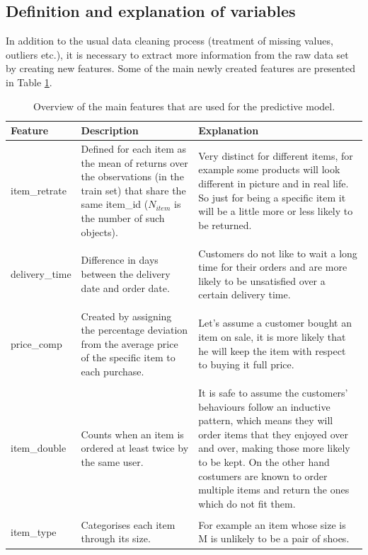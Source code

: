 \documentclass[a4paper,12pt]{article}
\begin{document}
 \subsection{Definition and explanation of variables }  \label{Subsec::variables}
In addition to the usual data cleaning process (treatment of missing values, outliers etc.), it is necessary to extract more information from the raw data set by creating new features. Some of the main newly created features are presented in Table \ref{Table::Features}.
\begin{table}[h]
\begin{tabular}{|l p{6.5cm} p{6.5cm}|}
\hline
\textbf{Feature} & \textbf{Description} & \textbf{Explanation} \\
\hline \hline
item\_retrate 
& Defined for each item as  the mean of returns over the observations (in the train set) that share the same item\_id ($N_{item}$ is the number of such objects).
& Very distinct for different items, for example some  products will look different       in picture and in real life. So just for being a specific item   it will be a little more or less likely  to be returned. \\
& & \\
delivery\_time 
& Difference in days between the delivery date and order date.
& Customers do not like to wait a  long time for their orders and  are more likely to be unsatisfied  over a certain delivery time.  \\
& & \\
price\_comp
& Created by assigning the percentage deviation from the average price of the specific item to each purchase. 
& Let's assume a customer bought an item on sale, it is more likely that he will keep the item with respect to buying it full price. \\
& & \\
item\_double
& Counts when an item is ordered  at least twice by the same user.
& It is safe to assume the customers' behaviours follow an inductive pattern, which means they will  order items that they enjoyed over and over, making those more likely to be kept. On the other hand costumers are known to order multiple items and return the ones which do not fit them.  \\
& & \\
item\_type
& Categorises each item through its size. 
& For example an item whose size is M is unlikely to be a pair of shoes.  \\ 
\hline
\end{tabular}

\caption{Overview of the main features that are used for the predictive model.}
\label{Table::Features}
\end{table}
\end{document}
